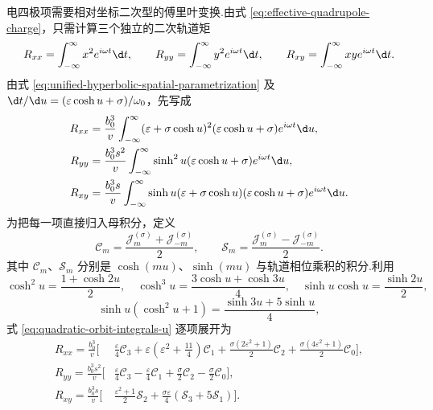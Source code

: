 电四极项需要相对坐标二次型的傅里叶变换.由式 \eqref{eq:effective-quadrupole-charge}，只需计算三个独立的二次轨道矩
\begin{equation}
 R_{xx}=\int_{-\infty}^{\infty}x^2e^{i\omega t}\d t,
 \qquad
 R_{yy}=\int_{-\infty}^{\infty}y^2e^{i\omega t}\d t,
 \qquad
 R_{xy}=\int_{-\infty}^{\infty}xye^{i\omega t}\d t.
 \label{eq:quadratic-orbit-moments-definition}
\end{equation}
由式 \eqref{eq:unified-hyperbolic-spatial-parametrization} 及 $\d t/\d u=(\varepsilon\cosh u+\sigma)/\omega_0$，先写成
\begin{equation}
 \begin{aligned}
 R_{xx}&=\frac{b_0^3}{v}\int_{-\infty}^{\infty}
 (\varepsilon+\sigma\cosh u)^2(\varepsilon\cosh u+\sigma)e^{i\omega t}\d u,\\
 R_{yy}&=\frac{b_0^3s^2}{v}\int_{-\infty}^{\infty}
 \sinh^2u(\varepsilon\cosh u+\sigma)e^{i\omega t}\d u,\\
 R_{xy}&=\frac{b_0^3s}{v}\int_{-\infty}^{\infty}
 \sinh u(\varepsilon+\sigma\cosh u)(\varepsilon\cosh u+\sigma)e^{i\omega t}\d u.
 \end{aligned}
 \label{eq:quadratic-orbit-integrals-u}
\end{equation}
为把每一项直接归入母积分，定义
\begin{equation}
 \mathcal C_m=\frac{\mathcal J_m^{(\sigma)}+\mathcal J_{-m}^{(\sigma)}}{2},
 \qquad
 \mathcal S_m=\frac{\mathcal J_m^{(\sigma)}-\mathcal J_{-m}^{(\sigma)}}{2}.
 \label{eq:hyperbolic-Cm-Sm-definition}
\end{equation}
其中 $\mathcal C_m$、$\mathcal S_m$ 分别是 $\cosh(mu)$、$\sinh(mu)$ 与轨道相位乘积的积分.利用
\begin{equation}
 \cosh^2u=\frac{1+\cosh2u}{2},
 \quad
 \cosh^3u=\frac{3\cosh u+\cosh3u}{4},
 \quad
 \sinh u\cosh u=\frac{\sinh2u}{2},
\end{equation}
\begin{equation}
 \sinh u(\cosh^2u+1)=\frac{\sinh3u+5\sinh u}{4},
\end{equation}
式 \eqref{eq:quadratic-orbit-integrals-u} 逐项展开为
\begin{equation}
 \begin{aligned}
 R_{xx}=\frac{b_0^3}{v}\bigg[&
 \frac{\varepsilon}{4}\mathcal C_3
 +\varepsilon\left(\varepsilon^2+\frac{11}{4}\right)\mathcal C_1
 +\frac{\sigma(2\varepsilon^2+1)}{2}\mathcal C_2
 +\frac{\sigma(4\varepsilon^2+1)}{2}\mathcal C_0\bigg],\\
 R_{yy}=\frac{b_0^3s^2}{v}\bigg[&
 \frac{\varepsilon}{4}\mathcal C_3
 -\frac{\varepsilon}{4}\mathcal C_1
 +\frac{\sigma}{2}\mathcal C_2
 -\frac{\sigma}{2}\mathcal C_0\bigg],\\
 R_{xy}=\frac{b_0^3s}{v}\bigg[&
 \frac{\varepsilon^2+1}{2}\mathcal S_2
 +\frac{\sigma\varepsilon}{4}
 \left(\mathcal S_3+5\mathcal S_1\right)\bigg].
 \end{aligned}
 \label{eq:quadratic-orbit-moments-before-recurrence}
\end{equation}
